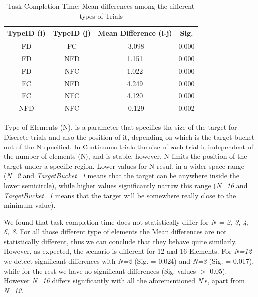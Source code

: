 \begin{table}[H]
\centering
\begin{tabular}{c || c || c || c}
TypeID (i) & TypeID (j) & Mean Difference (i-j) & Sig. \\
\hline \hline
FD      &   FC      &   -3.098      & 0.000 \\
FD      &   NFD     &   1.151       & 0.000 \\
FD      &   NFC     &   1.022       & 0.000 \\
FC      &   NFD     &   4.249       & 0.000 \\
FC      &   NFC     &   4.120       & 0.000 \\
NFD     &   NFC     &   -0.129      & 0.002
\end{tabular}
\caption{Task Completion Time: Mean differences among the different types of Trials}
\label{tab:totaTimeAnova}
\end{table}

Type of Elements (N), is a parameter that specifies the size of the target for Discrete trials and also the position of it, depending on which is the target bucket out of the N specified. In Continuous trials the size of each trial is independent of the number of elements (N), and is stable, however, N limits the position of the target under a specific region. 
Lower values for N result in a wider space range (\emph{N=2} and \emph{TargetBucket=1} means that the target can be anywhere inside the lower semicircle), while higher values significantly narrow this range (\emph{N=16} and \emph{TargetBucket=1} means that the target will be somewhere really close to the minimum value).

We found that task completion time does not statistically differ for \emph{N = 2, 3, 4, 6, 8}. For all those different type of elements the Mean differences are not statistically different, thus we can conclude that they behave quite similarly. However, as expected, the scenario is different for 12 and 16 Elements. For \emph{N=12} we detect significant differences with \emph{N=2} (Sig. = 0.024) and \emph{N=3} (Sig. = 0.017), while for the rest we have no significant differences (Sig. values $>$ 0.05). However \emph{N=16} differs significantly with all the aforementioned \emph{N}'s, apart from \emph{N=12}. 

